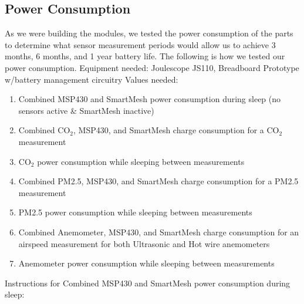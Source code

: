 \subsection{Power Consumption}
As we were building the modules, we tested the power consumption of the parts to determine what sensor measurement periods would allow us to achieve 3 months, 6 months, and 1 year battery life. The following is how we tested our power consumption.
\newline \newline
Equipment needed: Joulescope JS110, Breadboard Prototype w/battery management circuitry
\newline Values needed:
\begin{enumerate}
\item Combined MSP430 and SmartMesh power consumption during sleep (no sensors active \& SmartMesh inactive)
\item Combined CO$_2$, MSP430, and SmartMesh charge consumption for a CO$_2$ measurement
\item CO$_2$ power consumption while sleeping between measurements
\item Combined PM2.5, MSP430, and SmartMesh charge consumption for a PM2.5 measurement
\item PM2.5 power consumption while sleeping between measurements
\item Combined Anemometer, MSP430, and SmartMesh charge consumption for an airspeed measurement for both Ultrasonic and Hot wire anemometers
\item Anemometer power consumption while sleeping between measurements
\end{enumerate}
Instructions for Combined MSP430 and SmartMesh power consumption during sleep:
